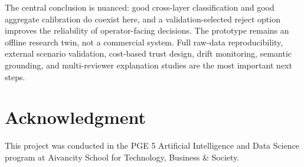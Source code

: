 \documentclass[10pt,conference]{IEEEtran}
\begin{document}
The central conclusion is nuanced: good cross-layer classification and good
aggregate calibration do coexist here, and a validation-selected reject option
improves the reliability of operator-facing decisions.  The prototype remains
an offline research twin, not a commercial system.  Full raw-data
reproducibility, external scenario validation, cost-based trust design, drift
monitoring, semantic grounding, and multi-reviewer explanation studies are the
most important next steps.

\section*{Acknowledgment}
This project was conducted in the PGE 5 Artificial Intelligence and Data
Science program at Aivancity School for Technology, Business \& Society.



\end{document}
